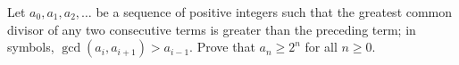 Let $a_0, a_1, a_2, \ldots$ be a sequence of positive integers such that the greatest common divisor of any two consecutive terms is greater than the preceding term; in symbols, $\gcd(a_i, a_{i+1}) > a_{i-1}$. Prove that $a_n \geq 2^n$ for all $n \geq 0$.

